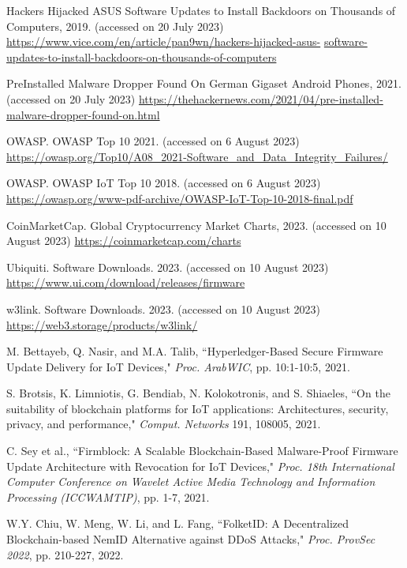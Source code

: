\documentclass[conference]{IEEEtran}
\begin{document}
\begin{thebibliography}{100}

Hackers Hijacked ASUS Software Updates to Install Backdoors on Thousands of Computers, 2019. (accessed on 20 July 2023) \url{https://www.vice.com/en/article/pan9wn/hackers-hijacked-asus-}
\url{software-updates-to-install-backdoors-on-thousands-of-computers}

PreInstalled Malware Dropper Found On German Gigaset Android Phones, 2021. (accessed on 20 July 2023)
\url{https://thehackernews.com/2021/04/pre-installed-malware-dropper-found-on.html}


OWASP. OWASP Top 10 2021. (accessed on 6 August 2023)
\url{https://owasp.org/Top10/A08_2021-Software_and_Data_Integrity_Failures/}

OWASP. OWASP IoT Top 10 2018. (accessed on 6 August 2023)
\url{https://owasp.org/www-pdf-archive/OWASP-IoT-Top-10-2018-final.pdf}

CoinMarketCap. Global Cryptocurrency Market Charts, 2023. (accessed on 10 August 2023)
\url{https://coinmarketcap.com/charts}

Ubiquiti. Software Downloads. 2023.  (accessed on 10 August 2023)
\url{https://www.ui.com/download/releases/firmware}

w3link. Software Downloads. 2023. (accessed on 10 August 2023)
\url{https://web3.storage/products/w3link/}

M. Bettayeb, Q. Nasir, and M.A. Talib,
``Hyperledger-Based Secure Firmware Update Delivery for IoT Devices," \emph{Proc. ArabWIC}, pp. 10:1-10:5, 2021.

S. Brotsis, K. Limniotis, G. Bendiab, N. Kolokotronis, and S. Shiaeles,
``On the suitability of blockchain platforms for IoT applications: Architectures, security, privacy, and performance," \emph{Comput. Networks} 191, 108005, 2021.

C. Sey et al.,
``Firmblock: A Scalable Blockchain-Based Malware-Proof Firmware Update Architecture with Revocation for IoT Devices," \emph{Proc. 18th International Computer Conference on Wavelet Active Media Technology and Information Processing (ICCWAMTIP)}, pp. 1-7, 2021.

W.Y. Chiu, W. Meng, W. Li, and L. Fang, ``FolketID: A Decentralized Blockchain-based NemID Alternative against DDoS Attacks," \emph{Proc. ProvSec 2022}, pp. 210-227, 2022.


\end{thebibliography}
\end{document}
